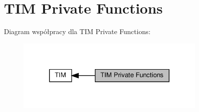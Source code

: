 \hypertarget{group___t_i_m___private___functions}{}\section{T\+IM Private Functions}
\label{group___t_i_m___private___functions}
Diagram współpracy dla T\+IM Private Functions\+:\nopagebreak
\begin{figure}[H]
\begin{center}
\leavevmode
\includegraphics[width=263pt]{group___t_i_m___private___functions}
\end{center}
\end{figure}
